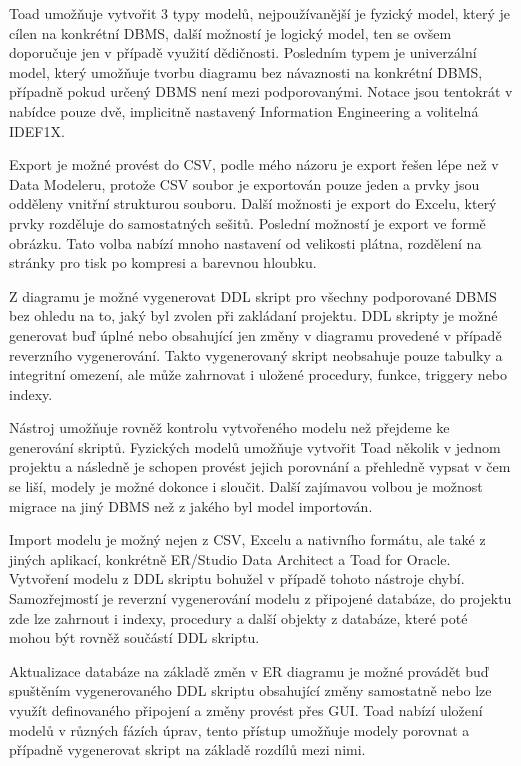\documentclass[czech,bachelor,public,dept460,male,oneside]{diploma}
\begin{document}
		Toad umožňuje vytvořit 3 typy modelů, nejpoužívanější je fyzický model, který je cílen na konkrétní DBMS, další možností je logický model, ten se ovšem doporučuje jen v případě využití dědičnosti. Posledním typem je univerzální model, který umožňuje tvorbu diagramu bez návaznosti na konkrétní DBMS, případně pokud určený DBMS není mezi podporovanými. Notace jsou tentokrát v nabídce pouze dvě, implicitně nastavený Information Engineering a volitelná IDEF1X.
		
		Export je možné provést do CSV, podle mého názoru je export řešen lépe než v Data Modeleru, protože CSV soubor je exportován pouze jeden a prvky jsou odděleny vnitřní strukturou souboru. Další možnosti je export do Excelu, který prvky rozděluje do samostatných sešitů. Poslední možností je export ve formě obrázku. Tato volba nabízí mnoho nastavení od velikosti plátna, rozdělení na stránky pro tisk po kompresi a barevnou hloubku.
		
		Z diagramu je možné vygenerovat DDL skript pro všechny podporované DBMS bez ohledu na to, jaký byl zvolen při zakládaní projektu. DDL skripty je možné generovat buď úplné nebo obsahující jen změny v diagramu provedené v případě reverzního vygenerování. Takto vygenerovaný skript neobsahuje pouze tabulky a integritní omezení, ale může zahrnovat i uložené procedury, funkce, triggery nebo indexy. 
		
		Nástroj umožňuje rovněž kontrolu vytvořeného modelu než přejdeme ke generování skriptů. Fyzických modelů umožňuje vytvořit Toad několik v jednom projektu a následně je schopen provést jejich porovnání a přehledně vypsat v čem se liší, modely je možné dokonce i sloučit. Další zajímavou volbou je možnost migrace na jiný DBMS než z jakého byl model importován.
		
		Import modelu je možný nejen z CSV, Excelu a nativního formátu, ale také z jiných aplikací, konkrétně ER/Studio Data Architect a Toad for Oracle. Vytvoření modelu z DDL skriptu bohužel v případě tohoto nástroje chybí. Samozřejmostí je reverzní vygenerování modelu z připojené databáze, do projektu zde lze zahrnout i indexy, procedury a další objekty z databáze, které poté mohou být rovněž součástí DDL skriptu.
		
		Aktualizace databáze na základě změn v ER diagramu je možné provádět buď spuštěním vygenerovaného DDL skriptu obsahující změny samostatně nebo lze využít definovaného připojení a změny provést přes GUI. Toad nabízí uložení modelů v různých fázích úprav, tento přístup umožňuje modely porovnat a případně vygenerovat skript na základě rozdílů mezi nimi.
		
\end{document}

